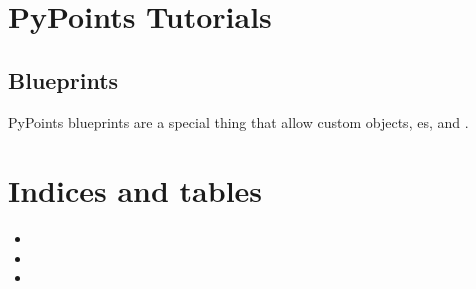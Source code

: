 \documentclass[letterpaper,10pt,english]{sphinxmanual}
\begin{document}

\begin{fulllineitems}
\label{\detokenize{pypoints:pypoints.text_to_blueprint}}
\end{fulllineitems}



\chapter{PyPoints Tutorials}
\label{\detokenize{tutorial:pypoints-tutorials}}\label{\detokenize{tutorial::doc}}

\section{Blueprints}
\label{\detokenize{blueprint:blueprints}}\label{\detokenize{blueprint::doc}}
PyPoints blueprints are a special thing that allow custom objects, {\hyperref[\detokenize{pypoints:pypoints.MenuBox}]{}}es, and {\hyperref[\detokenize{pypoints:pypoints.Text}]{}}.


\chapter{Indices and tables}
\label{\detokenize{index:indices-and-tables}}\begin{itemize}
\item {} 

\item {} 

\item {} 

\end{itemize}


\renewcommand{\indexname}{Python Module Index}
\begin{sphinxtheindex}
\let\bigletter\sphinxstyleindexlettergroup
\bigletter{p}
\item\relax{}
\end{sphinxtheindex}

\renewcommand{\indexname}{Index}
\printindex
\end{document}
